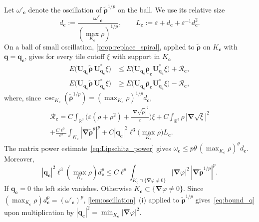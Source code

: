 \documentclass[final,reqno]{amsart}
\theoremstyle{remark}
\renewcommand{\le}{\leqslant}
\renewcommand{\ge}{\geqslant}
\renewcommand{\epsilon}{\varepsilon}
\newcommand{\ol}[1]{\overline{#1}}
\newcommand{\ul}[1]{\underline{#1}}
\newcommand{\wt}[1]{\widetilde{#1}}
\newcommand{\RR}{\mathbb{R}}
\newcommand{\grad}{\bm{\nabla}}
\begin{document}
Let $\omega'_{\mathbf{c}}$ denote the oscillation of $\wt{\bm{\rho}}^{1/p}$ on the ball. We use its relative size
\[
d_{\mathbf{c}}:=\frac{\omega'_{\mathbf{c}}}{(\max_{K_{\mathbf{c}}}\rho)^{1/p}},\qquad
L_{\mathbf{c}}:=\epsilon+d_{\mathbf{c}}+\epsilon^{-1}d_{\mathbf{c}}^2.
\]
On a ball of small oscillation, \cref{prop:replace_spiral}, applied to $\wt{\bm{\rho}}$ on $K_{\mathbf{c}}$ with $\mathbf{q}=\mathbf{q}_{\mathbf{c}}$, gives for every tile cutoff $\xi$ with support in $K_{\mathbf{c}}$
\begin{align*}
E\big(\mathbf{U}_{\mathbf{q}_{\mathbf{c}}}\wt{\bm{\rho}}\,\mathbf{U}_{\mathbf{q}_{\mathbf{c}}}^*\xi\big)&\le E\big(\mathbf{U}_{\mathbf{q}_{\mathbf{c}}}\ul{\bm{\rho}}_{\mathbf{c}}\mathbf{U}_{\mathbf{q}_{\mathbf{c}}}^*\xi\big)+\mathcal{R}_{\mathbf{c}},\\
E\big(\mathbf{U}_{\mathbf{q}_{\mathbf{c}}}\wt{\bm{\rho}}\,\mathbf{U}_{\mathbf{q}_{\mathbf{c}}}^*\xi\big)&\ge E\big(\mathbf{U}_{\mathbf{q}_{\mathbf{c}}}\ol{\bm{\rho}}_{\mathbf{c}}\mathbf{U}_{\mathbf{q}_{\mathbf{c}}}^*\xi\big)-\mathcal{R}_{\mathbf{c}},
\end{align*}
where, since $\operatorname{osc}_{K_{\mathbf{c}}}(\wt{\bm{\rho}}^{1/p})=(\max_{K_{\mathbf{c}}}\rho)^{1/p}d_{\mathbf{c}}$,
\begin{multline*}
\mathcal{R}_{\mathbf{c}}=C\int_{\RR^3}\Big(\epsilon(\rho+\rho^2)+\frac{|\grad\sqrt{\wt{\bm{\rho}}}|^2}{\epsilon}\Big)\xi+C\int_{\RR^3}\rho\,|\grad\sqrt\xi|^2\\
+\frac{C\ell^p}{\epsilon^s}\int_{K_{\mathbf{c}}}|\grad\wt{\bm{\rho}}^\theta|^p+C|\mathbf{q}_{\mathbf{c}}|^2\ell^3\Big(\max_{K_{\mathbf{c}}}\rho\Big)L_{\mathbf{c}}.
\end{multline*}
The matrix power estimate~\cref{eq:Lipschitz_power} gives $\omega_{\mathbf{c}}\le p\theta\,(\max_{K_{\mathbf{c}}}\rho)^\theta d_{\mathbf{c}}$. Moreover,
\begin{equation}\label{eq:bound_q}
|\mathbf{q}_{\mathbf{c}}|^2\ell^3(\max_{K_{\mathbf{c}}}\rho)d_{\mathbf{c}}^p
\le C\ell^p\int_{K_{\mathbf{c}}\cap\{\grad\varphi\ne0\}}|\grad\varphi|^2\,|\grad\wt{\bm{\rho}}^{1/p}|^p .
\end{equation}
If $\mathbf{q}_{\mathbf{c}}=0$ the left side vanishes. Otherwise $K_{\mathbf{c}}\subset\{\grad\varphi\ne0\}$. Since $(\max_{K_{\mathbf{c}}}\rho)d_{\mathbf{c}}^p=(\omega'_{\mathbf{c}})^p$, \cref{lem:oscillation}~(i) applied to $\wt{\bm{\rho}}^{1/p}$ gives~\cref{eq:bound_q} upon multiplication by $|\mathbf{q}_{\mathbf{c}}|^2=\min_{K_{\mathbf{c}}}|\grad\varphi|^2$.
\end{document}
